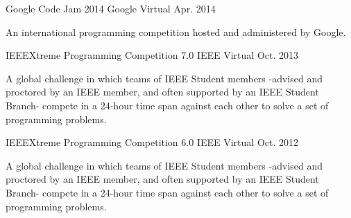

\begin{cventries}

  
  \cventry
    {Google Code Jam 2014} %
    {Google} %
    {Virtual} %
    {Apr. 2014} %
    {
      \begin{cvitems} %
        \item {An international programming competition hosted and administered by Google.}
      \end{cvitems}
    }  
  
  \cventry
    {IEEEXtreme Programming Competition 7.0} %
    {IEEE} %
    {Virtual} %
    {Oct. 2013} %
    {
      \begin{cvitems} %
        \item {A global challenge in which teams of IEEE Student members -advised and proctored by an IEEE member, and often supported by an IEEE Student Branch- compete in a 24-hour time span against each other to solve a set of programming problems.}
      \end{cvitems}
    }
    
  \cventry
    {IEEEXtreme Programming Competition 6.0} %
    {IEEE} %
    {Virtual} %
    {Oct. 2012} %
    {
      \begin{cvitems} %
        \item {A global challenge in which teams of IEEE Student members -advised and proctored by an IEEE member, and often supported by an IEEE Student Branch- compete in a 24-hour time span against each other to solve a set of programming problems.}
      \end{cvitems}
    }


\end{cventries}
